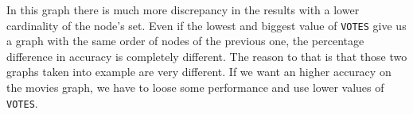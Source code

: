 \s \nd In this graph there is much more discrepancy in the results with a lower cardinality of the node's set. Even if the lowest and biggest value of \texttt{VOTES} give us a graph with the same order of nodes of the previous one, the percentage difference in accuracy is completely different. The reason to that is that those two graphs taken into example are very different. If we want an higher accuracy on the movies graph, we have to loose some performance and use lower values of \texttt{VOTES}.

